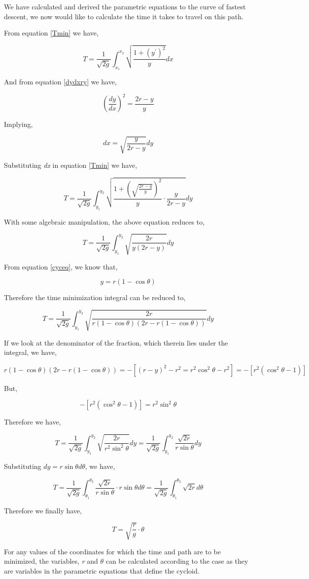 

{We have calculated and derived the parametric equations to the curve of fastest descent, we now would like to calculate the time it takes to travel on this path.}

{From equation \ref{Tmin} we have,}

	$$T = \frac{1}{\sqrt{2g}}\int_{x_1}^{x_2} \sqrt{\frac{1 + \left(y^{\prime}\right)^2}{y}} dx$$

{And from equation \ref{dydxry} we have,}

	$$\left(\frac{dy}{dx}\right)^2 = \frac{2r - y}{y}$$

{Implying,}

	$$dx = \sqrt{\frac{y}{2r - y}}dy$$

{Substituting \textit{dx} in equation \ref{Tmin} we have,}

	$$T = \frac{1}{\sqrt{2g}}\int_{y_1}^{y_2} \sqrt{\frac{1 + \left(\sqrt{\frac{2r - y}{y}}\right)^2}{y}\cdot\frac{y}{2r - y}}dy$$

{With some algebraic manipulation, the above equation reduces to,}

	$$T = \frac{1}{\sqrt{2g}}\int_{y_1}^{y_2}\sqrt{\frac{2r}{y\left(2r -y\right)}}dy$$

{From equation \ref{cyceq}, we know that,}

	$$y = r\left(1 - \cos\theta\right)$$

{Therefore the time minimization integral can be reduced to,}

	$$T = \frac{1}{\sqrt{2g}}\int_{y_1}^{y_2}\sqrt{\frac{2r}{r\left(1 - \cos\theta\right)\left(2r -r\left(1 - \cos\theta\right)\right)}}dy$$

{If we look at the denominator of the fraction, which therein lies under the integral, we have,}

	$$r\left(1 - \cos\theta\right)\left(2r -r\left(1 - \cos\theta\right)\right) = -\left[\left(r - y\right)^2 - r^2 = r^2\cos^2\theta - r^2\right] = -\left[r^2\left(\cos^2\theta - 1\right)\right]$$

{But,}

	$$-\left[r^2\left(\cos^2\theta - 1\right)\right] = r^2\sin^2\theta$$

{Therefore we have,}

	$$T = \frac{1}{\sqrt{2g}}\int_{y_1}^{y_2}\sqrt{\frac{2r}{r^2\sin^2\theta}}dy = \frac{1}{\sqrt{2g}}\int_{y_1}^{y_2}\frac{\sqrt{2r}}{r\sin\theta}dy$$

{Substituting $dy = r\sin\theta d\theta$, we have,}

	$$T = \frac{1}{\sqrt{2g}}\int_{\theta_1}^{\theta_2}\frac{\sqrt{2r}}{r\sin\theta}\cdot r\sin\theta d\theta = \frac{1}{\sqrt{2g}}\int_{\theta_1}^{\theta_2}\sqrt{2r}d\theta$$

{Therefore we finally have,}

	\begin{equation}
		T = \sqrt{\frac{r}{g}}\cdot\theta
		\label{Tcal}
	\end{equation}

{For any values of the coordinates for which the time and path are to be minimized, the variables, \textit{r} and $\theta$ can be calculated according to the case as they are variables in the parametric equations that define the cycloid.}
